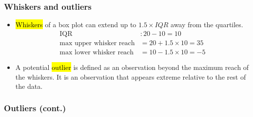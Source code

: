 \documentclass[11pt,containsverbatim,handout]{beamer}
\newcommand{\soln}[1]{ }
\begin{document}

\begin{frame}[fragile]
\frametitle{Whiskers and outliers}

\begin{itemize}

\item \hl{Whiskers} of a box plot can extend up to $1.5 \times IQR$ away from the quartiles.
\pause
\vspace{-0.5cm}
{\small
\begin{align*}
\text{IQR}&: 20 - 10 = 10 \\
\text{max~upper~whisker~reach}&= 20 + 1.5 \times 10 = 35 \\
\text{max~lower~whisker~reach}&= 10 - 1.5 \times 10 = -5
\end{align*}
}

\pause
\vspace{-0.25cm}
\item A potential \hl{outlier} is defined as an observation beyond the maximum reach of the whiskers. It is an observation that appears extreme relative to the rest of the data.

\end{itemize}

\end{frame}


\begin{frame}
\frametitle{Outliers (cont.)}


\soln{
\onslide<2->{
\begin{itemize}
\item Identify extreme skew in the distribution.
\item Identify data collection and entry errors.
\item Provide insight into interesting features of the data.
\end{itemize}
}
}

\end{frame}

\end{document}
